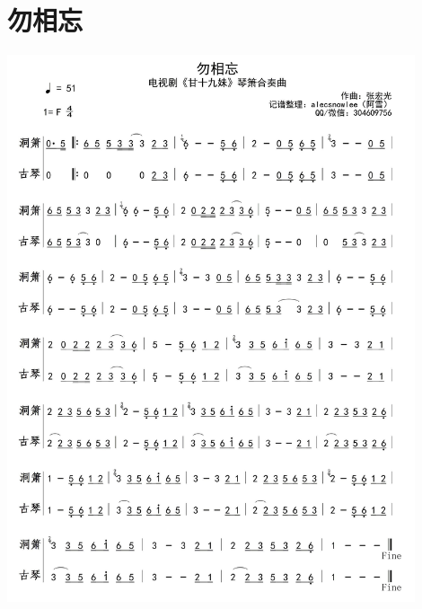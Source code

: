 \documentclass[cn,pad,twocol]{elegantbook}
\begin{document}
\section{勿相忘}  \includegraphics[width=0.9\textwidth]{rpi400/20210127勿相忘.jpg}
\end{document}
